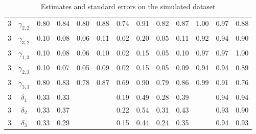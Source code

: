 \documentclass[bimj,fleqn]{w-art}\usepackage[]{graphicx}\usepackage[]{color}
\theoremstyle{plain}
\theoremstyle{definition}
\begin{document}
\begin{table}[ht]
{\begin{tabular}{ccccccccccccc}
    3 & $\gamma_{2, 2}$ & 0.80 & 0.84 & 0.80 & 0.88 & 0.74 & 0.91 & 0.82 & 0.87 & 1.00 & 0.97 & 0.88 \\ 
    3 & $\gamma_{3, 2}$ & 0.10 & 0.08 & 0.06 & 0.11 & 0.02 & 0.20 & 0.05 & 0.11 & 0.92 & 0.94 & 0.90 \\ 
    3 & $\gamma_{1, 3}$ & 0.10 & 0.08 & 0.06 & 0.10 & 0.02 & 0.15 & 0.05 & 0.10 & 0.97 & 0.97 & 1.00 \\ 
    3 & $\gamma_{2, 3}$ & 0.10 & 0.07 & 0.05 & 0.09 & 0.02 & 0.15 & 0.05 & 0.09 & 0.94 & 0.94 & 0.89 \\ 
    3 & $\gamma_{3, 3}$ & 0.80 & 0.83 & 0.78 & 0.87 & 0.69 & 0.90 & 0.79 & 0.86 & 0.99 & 0.91 & 0.76 \\ 
    3 & $\delta_{1}$ & 0.33 & 0.33 &  &  & 0.19 & 0.49 & 0.28 & 0.39 &  & 0.94 & 0.94 \\ 
    3 & $\delta_{2}$ & 0.33 & 0.37 &  &  & 0.22 & 0.54 & 0.31 & 0.43 &  & 0.93 & 0.90 \\ 
    3 & $\delta_{3}$ & 0.33 & 0.29 &  &  & 0.15 & 0.44 & 0.24 & 0.35 &  & 0.94 & 0.93 \\ 
   \hline
\end{tabular}
}
\caption{Estimates and standard errors on the simulated dataset} 
\label{table:simul_estimates_std_errors}
\end{table}
\end{document}
